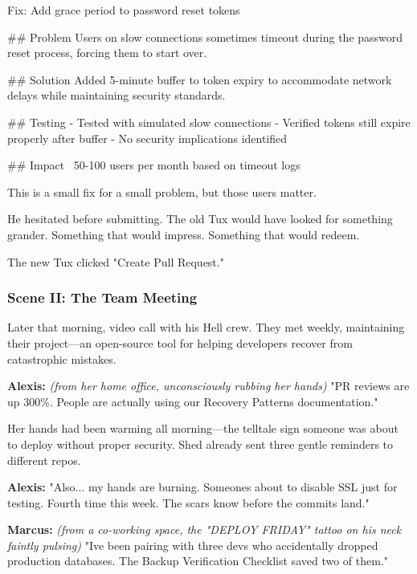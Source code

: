 \begin{codeblock}
Fix: Add grace period to password reset tokens

## Problem
Users on slow connections sometimes timeout during the password 
reset process, forcing them to start over.

## Solution  
Added 5-minute buffer to token expiry to accommodate network delays
while maintaining security standards.

## Testing
- Tested with simulated slow connections
- Verified tokens still expire properly after buffer
- No security implications identified

## Impact
~50-100 users per month based on timeout logs

This is a small fix for a small problem, but those users matter.
\end{codeblock}

He hesitated before submitting. The old Tux would have looked for something grander. Something that would impress. Something that would redeem.

The new Tux clicked "Create Pull Request."

\bookdivider

\subsubsection{Scene II: The Team Meeting}\label{scene-ii-the-team-meeting}

Later that morning, video call with his Hell crew. They met weekly, maintaining their project---an open-source tool for helping developers recover from catastrophic mistakes.

\textbf{Alexis:} \emph{(from her home office, unconsciously rubbing her hands)} "PR reviews are up 300\%. People are actually using our \textquotesingle Recovery Patterns\textquotesingle{} documentation."

Her hands had been warming all morning---the telltale sign someone was about to deploy without proper security. She\textquotesingle d already sent three gentle reminders to different repos.

\textbf{Alexis:} "Also... my hands are burning. Someone\textquotesingle s about to disable SSL \textquotesingle just for testing.\textquotesingle{} Fourth time this week. The scars know before the commits land."

\textbf{Marcus:} \emph{(from a co-working space, the "DEPLOY FRIDAY" tattoo on his neck faintly pulsing)} "I\textquotesingle ve been pairing with three devs who accidentally dropped production databases. The \textquotesingle Backup Verification Checklist\textquotesingle{} saved two of them."

